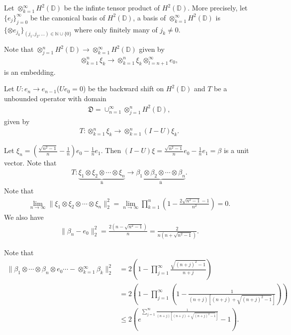 \documentclass[a4paper,10pt]{amsart}
\newcommand{\DDD}{\mathfrak D}
\newcommand{\N}{\mathbb N} %
\newcommand{\Hd}{H^{2}(\mathbb{D})}
\begin{document}
Let $\otimes_{k=1}^{\infty} \Hd$ be the infinte tensor product of 
$\Hd$. More precisely, let $\{ e_j \}_{j=0}^{\infty}$ be the canonical 
basis of $\Hd$, a basis of $\otimes_{k=1}^{\infty} \Hd$ is 
$\{\otimes e_{j_k}\}_{(j_1, j_2, \ldots) \in \N \cup \{0\}}$ 
where only finitely many of $j_k \neq 0$.

Note that $\otimes_{j=1}^{n}\Hd \to \otimes_{k=1}^{\infty} \Hd$ given by
\begin{align*}
    \otimes_{k=1}^{n} \xi_{k} \to 
    \otimes_{k=1}^{n} \xi_{k} \otimes_{l=n+1}^{\infty} e_{0},  
\end{align*}
is an embedding.

Let $U: e_{n} \to e_{n-1}$($Ue_0 = 0$) be the backward shift on $\Hd$ 
and $T$ be a unbounded operator with domain 
\begin{align*}
    \DDD = \cup_{n=1}^{\infty} \otimes_{j=1}^{n}\Hd,
\end{align*}
given by
\begin{align*}
    T:  \otimes_{k=1}^{n} \xi_{k} \to \otimes_{k=1}^{n} (I-U)\xi_{k}.
\end{align*}

Let $\xi_n = (\frac{\sqrt{n^2-1}}{n}-\frac{1}{n})e_0 - \frac{1}{n}e_1$.
Then $(I-U)\xi = \frac{\sqrt{n^2-1}}{n}e_0 - \frac{1}{n}e_1 = \beta$ 
is a unit vector.
Note that
\begin{align*}
    T: \underbrace{\xi_1 \otimes \xi_2 \otimes \cdots 
    \otimes \xi_n}_\text{n}
    \to \underbrace{\beta_1 \otimes \beta_2 \otimes \cdots 
    \otimes \beta_n}_\text{n}.
\end{align*}
Note that
\begin{align*}
    \lim_{n \to \infty} 
    \| \xi_1 \otimes \xi_2 \otimes \cdots \otimes \xi_n\|_{2}^{2} = 
    \lim_{n \to \infty} 
    \prod_{k=1}^{n} (1-\frac{2\sqrt{n^2-1}-1}{n^2}) = 0.
\end{align*}
We also have
\begin{align*}
    \|\beta_n - e_0\|_{2}^{2} = \frac{2(n-\sqrt{n^2-1})}{n} = 
    \frac{2}{n(n+\sqrt{n^2-1})}.
\end{align*}

Note that
\begin{align*}
   \| \beta_1 \otimes \cdots \otimes \beta_n \otimes e_0 \cdots 
   -  \otimes_{k=1}^{\infty}\beta_k \|_{2}^{2} 
   &= 2(1 - \prod_{j=1}^{\infty} \frac{\sqrt{(n+j)^2-1}}{n+j})\\
   & = 2(1 - \prod_{j=1}^{\infty}(1 - \frac{1}
   {(n+j)[(n+j)+\sqrt{(n+j)^2 -1}]})) \\
   & \leq 2 (e^{\sum_{j=1}^{\infty}\frac{1}{(n+j)[(n+j)+\sqrt{(n+j)^2 -1}]}}
   - 1).
\end{align*}
\end{document}
